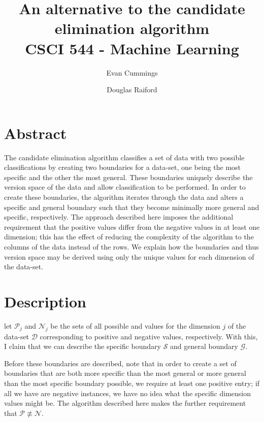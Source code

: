 
\DeclareMathOperator*{\argmax}{arg\,max}

\usepackage[top=.5in, bottom=.5in, left=.5in, right=.5in]{geometry}
\usepackage{framed}
\setlength{\columnsep}{8mm}
\usepackage{natbib}


\small

\title{An alternative to the candidate elimination algorithm \\ 
\vspace{5mm} \large CSCI 544 - Machine Learning}
\author{Evan Cummings \and Douglas Raiford}

\maketitle

\section{Abstract}

The candidate elimination algorithm classifies a set of data with two possible classifications by creating two boundaries for a data-set, one being the most specific and the other the most general.  These boundaries uniquely describe the version space of the data and allow classification to be performed.  In order to create these boundaries, the algorithm iterates through the data and alters a specific and general boundary such that they become minimally more general and specific, respectively.  The approach described here imposes the additional requirement that the positive values differ from the negative values in at least one dimension; this has the effect of reducing the complexity of the algorithm to the columns of the data instead of the rows.  We explain how the boundaries and thus version space may be derived using only the unique values for each dimension of the data-set.

\section{Description}

let $\mathcal{P}_j$ and $\mathcal{N}_j$ be the sets of all possible and values for the dimension $j$ of the data-set $\mathcal{D}$ corresponding to positive and negative values, respectively.  With this, I claim that we can describe the specific boundary $\mathcal{S}$ and general boundary $\mathcal{G}$.

Before these boundaries are described, note that in order to create a set of boundaries that are both more specific than the most general or more general than the most specific boundary possible, we require at least one positive entry; if all we have are negative instances, we have no idea what the specific dimension values might be.  The algorithm described here makes the further requirement that $\mathcal{P} \not\equiv \mathcal{N}$.


